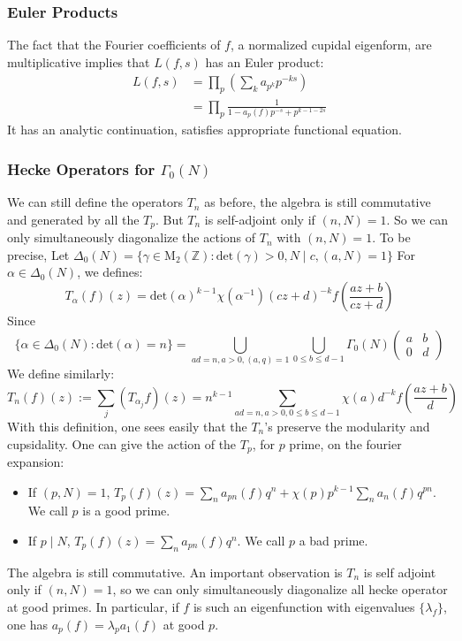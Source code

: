\documentclass[11pt,english]{smfart}
\theoremstyle{definition}
\theoremstyle{remark}
\begin{document}
\subsubsection{Euler Products}
The fact that the Fourier coefficients of $f$, a normalized cupidal eigenform, are multiplicative implies that $L(f,s)$ has an Euler product:
\[\begin{aligned}L(f,s)&=\prod _p(\sum_{k}a_{p^k} p^{-ks}) \\
    & =\prod _p\frac{1}{1-a_p(f)p^{-s}+p^{k-1-2s}}
\end{aligned}\]
It has an analytic continuation, satisfies appropriate functional equation.
\subsubsection{Hecke Operators for $\Gamma_0(N)$}
We can still define the operators $T_n$ as before, the algebra is still commutative and generated by all the $T_p$. But $T_n$ is self-adjoint only if $(n,N)=1$.
So we can only simultaneously diagonalize the actions of $T_n$ with $(n,N)=1$.
To be precise, Let $\Delta_0(N)=\{ \gamma \in \mathrm{M}_2(\mathbb{Z}): \mathrm{det} (\gamma) >0, N \mid c, (a,N)=1\}$
For $\alpha \in \Delta_0(N)$, we defines:
\[T_\alpha (f)(z)=\mathrm{det} (\alpha )^{k-1} \chi(\alpha ^{-1}) (cz+d)^{-k} f(\frac{az+b}{cz+d})\]
Since
\[ \{\alpha \in \Delta _0(N): \mathrm{det}(\alpha)=n \} =\bigcup_{ad=n,a>0,(a,q)=1}\bigcup_{0\leq b\leq d-1}\Gamma_0(N)\left(\begin{array}{ll}
    a & b \\
    0 & d
    \end{array}\right)\]
We define similarly:
\[T_n(f)(z):=\sum_j(T_{\alpha _j}f)(z)=n^{k-1} \sum_{ad=n, a>0, 0\leq b\leq d-1} \chi (a) d^{-k} f(\frac{az+b}{d})\]
With this definition, one sees easily that the $T_n$'s preserve the modularity
and cupsidality. One can give the action of the $T_p$, for $p$ prime, on the fourier expansion:
\begin{itemize}
    \item If $(p,N)=1$, $T_p(f)(z) =\sum_n a_{pn}(f) q^{n} +\chi (p) p^{k-1} \sum_n a_n(f)q^{pn}$. We call $p$ is a good prime.
    \item If $p \mid N$, $T_p(f)(z)=\sum_na_{pn}(f) q^n$. We call $p$ a bad prime.
\end{itemize}
The algebra is still commutative. An important observation is $T_n$ is self adjoint only if $(n,N)=1$, so we can only simultaneously diagonalize all hecke operator at good primes.
In particular, if $f$ is such an eigenfunction with eigenvalues $\{ \lambda _f\}$, one has $a_p(f) =\lambda _p  a_1(f) $ at good $p.$
\end{document}
